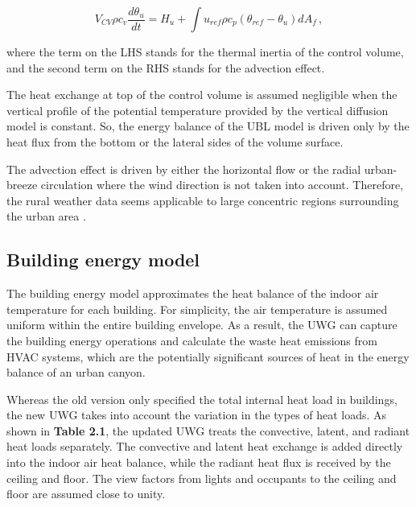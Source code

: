 \begin{equation}
V_{CV} \rho c_v \frac{d\theta_u}{dt} = H_u + \int u_{ref} \rho c_p (\theta_{ref} - \theta_u) dA_f\,,
\end{equation}

\vspace{15pt}
\noindent where the term on the LHS stands for the thermal inertia of the control volume, and the second term on the RHS stands for the advection effect.

The heat exchange at top of the control volume is assumed negligible when the vertical profile of the potential temperature provided by the vertical diffusion model is constant. So, the energy balance of the UBL model is driven only by the heat flux from the bottom or the lateral sides of the volume surface.

The advection effect is driven by either the horizontal flow or the radial urban-breeze circulation where the wind direction is not taken into account. Therefore, the rural weather data seems applicable to large concentric regions surrounding the urban area \cite{hidalgo2010scaling}.


\subsection{Building energy model}

The building energy model approximates the heat balance of the indoor air temperature for each building. For simplicity, the air temperature is assumed uniform within the entire building envelope. As a result, the UWG can capture the building energy operations and calculate the waste heat emissions from HVAC systems, which are the potentially significant sources of heat in the energy balance of an urban canyon.

Whereas the old version only specified the total internal heat load in buildings, the new UWG takes into account the variation in the types of heat loads. As shown in \textbf{Table 2.1}, the updated UWG treats the convective, latent, and radiant heat loads separately. The convective and latent heat exchange is added directly into the indoor air heat balance, while the radiant heat flux is received by the ceiling and floor. The view factors from lights and occupants to the ceiling and floor are assumed close to unity.

